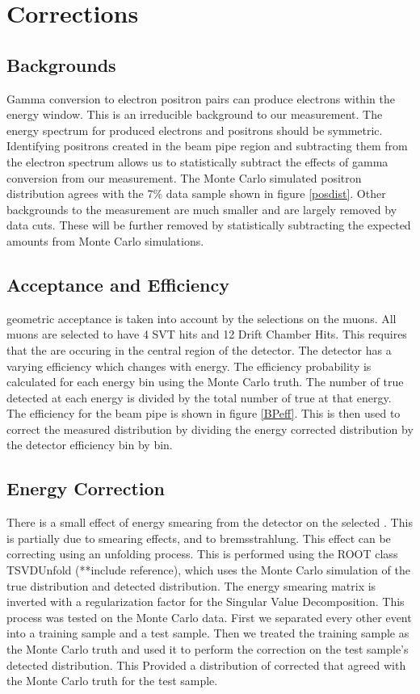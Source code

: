 \section{\deltaray Corrections}
\label{sec:corr}
\subsection{Backgrounds}
	Gamma conversion to electron positron pairs can produce electrons within the energy window. This is an irreducible background to our measurement. The energy spectrum for produced electrons and positrons should be symmetric. Identifying positrons created in the beam pipe region and subtracting them from the electron spectrum allows us to statistically subtract the effects of gamma conversion from our measurement. The Monte Carlo simulated positron distribution agrees with the 7\% data sample shown in figure \ref{posdist}.	
	Other backgrounds to the measurement are much smaller and are largely removed by data cuts. These will be further removed by statistically subtracting the expected amounts from Monte Carlo simulations.

\subsection{Acceptance and Efficiency}
	\babar geometric acceptance is taken into account by the selections on the muons. All muons are selected to have 4 SVT hits and 12 Drift Chamber Hits. This requires that the \deltarays are occuring in the central region of the detector.
	The \babar detector has a varying efficiency which changes with energy. The efficiency probability is calculated for each energy bin using the Monte Carlo truth. The number of true detected \deltarays at each energy is divided by the total number of true \deltarays at that energy. The efficiency for the beam pipe is shown in figure \ref{BPeff}. This is then used to correct the measured distribution by dividing the energy corrected \deltaray distribution by the detector efficiency bin by bin. 
\subsection{Energy Correction}
	There is a small effect of energy smearing from the detector on the selected \deltarays. This is partially due to smearing effects, and to bremsstrahlung. This effect can be correcting using an unfolding  process. This is performed using the ROOT class TSVDUnfold (**include reference), which uses the Monte Carlo simulation of the true distribution and detected distribution. The energy smearing matrix is inverted with a regularization factor for the Singular Value Decomposition. 
	This process was tested on the Monte Carlo data. First we separated every other event into a training sample and a test sample. Then we treated the training sample as the Monte Carlo truth and used it to perform the correction on the test sample’s detected distribution. This Provided a distribution of corrected \deltarays that agreed with the Monte Carlo truth for the test sample.

